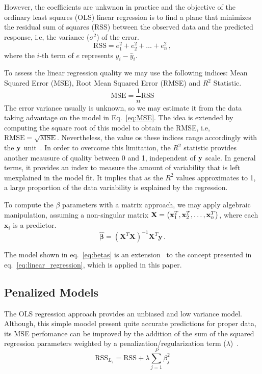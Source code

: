 However, the coefficients are unkwnon in practice and the objective of the ordinary least squares (OLS) linear regression is to find a plane that minimizes the residual sum of squares (RSS) between the observed data and the predicted response, i.e, the variance ($\sigma^2$) of the error.     
\begin{equation}
  \text{RSS} = e_1^2 + e_2^2 + \dots + e_n^2 \, , \label{eq:RSS}
\end{equation}
where the $i$-th term of $e$ represents $y_i - \hat{y}_i$.

To assess the linear regression quality we may use the following indices: Mean Squared Error (MSE), Root Mean Squared Error (RMSE) and $R^2$ Statistic.
\begin{equation}
  \text{MSE} = \frac{1}{n} \text{RSS}
  \label{eq:MSE}
\end{equation}
The error variance usually is unknown, so we may estimate it from the data taking advantage on the model in Eq.~\ref{eq:MSE}. The idea is extended by computing the square root of this model to obtain the RMSE, i.e, $\text{RMSE} = \sqrt{\text{MSE}}$. Nevertheless, the value os these indices range accordingly with the ${\bf y}$ unit~\cite{Kuhn2013}. In order to overcome this limitation, the $R^2$ statistic provides another meausure of quality between 0 and 1, independent of ${\bf y}$ scale. In general terms, it provides an index to measure the amount of variability that is left unexplained in the model fit. It implies that as the $R^2$ values approximates to 1, a large proportion of the data variability is explained by the regression.

To compute the $\beta$ parameters with a matrix approach, we may apply algebraic manipulation, assuming a non-singular matrix ${\bf X} = \left( \mathbf{x}_1^T, \mathbf{x}_2^T, \dots,\mathbf{x}_n^T \right)$, where each $\mathbf{x}_i$ is a predictor. 
\begin{equation}
\mathbf{\hat{\boldsymbol{\beta}}} = \left( \mathbf{X}^T\mathbf{X}  \right)^{-1}\mathbf{X}^T \mathbf{y} \, . \label{eq:betas}
\end{equation}

The model shown in eq.~\ref{eq:betas} is an extension~\cite{Kuhn2013} to the concept presented in eq.~\ref{eq:linear_regression}, which is applied in this paper.



\subsection{Penalized Models}
The OLS regression approach provides an unbiased and low variance model. Although, this simple moodel present quite accurate predictions for proper data, its MSE perfomance can be improved by the addition of the sum of the squared regression parameters weighted by a penalization/regularization term ($\lambda$)~\cite{Kuhn2013}.
\begin{equation}
  \text{RSS}_{L_2} = \text{RSS} + \lambda \sum_{j = 1}^{P} \beta_{j}^2
  \label{eq:ridge}
\end{equation}

